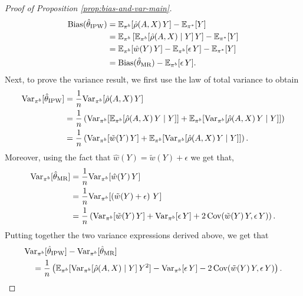 \begin{proof}[Proof of Proposition \ref{prop:bias-and-var-main}]
\begin{align*}
    \textup{Bias}(\hat{\theta}_{\textup{IPW}}) &= \mathbb{E}_{\pi^b}[\hat{\rho}(A, X)\, Y] - \mathbb{E}_{\pi^*}[Y] \\
    &= \mathbb{E}_{\pi^b}\left[\mathbb{E}_{\pi^b}[\hat{\rho}(A, X)\mid Y]\,Y \right] - \mathbb{E}_{\pi^*}[Y]  \\
    &= \mathbb{E}_{\pi^b}[\hat{w}(Y)\, Y] - \mathbb{E}_{\pi^b}[\epsilon\, Y] - \mathbb{E}_{\pi^*}[Y] \\
    &= \textup{Bias}(\hat{\theta}_{\textup{MR}}) - \mathbb{E}_{\pi^b}[\epsilon\, Y].
\end{align*}
Next, to prove the variance result, we first use the law of total variance to obtain
\begin{align*}
    \textup{Var}_{\pi^b}[\hat{\theta}_{\textup{IPW}}] &= \frac{1}{n} \textup{Var}_{\pi^b}[\hat{\rho}(A, X)\,Y]\\
    &= \frac{1}{n} \left( \textup{Var}_{\pi^b}[\mathbb{E}_{\pi^b}[\hat{\rho}(A, X)\,Y\mid Y]] + \mathbb{E}_{\pi^b}[\textup{Var}_{\pi^b}[\hat{\rho}(A, X)\,Y\mid Y]]\right)\\
    &= \frac{1}{n} \left( \textup{Var}_{\pi^b}[\tilde{w}(Y)\,Y] + \mathbb{E}_{\pi^b}[\textup{Var}_{\pi^b}[\hat{\rho}(A, X)\,Y\mid Y]]\right).
\end{align*}
Moreover, using the fact that $\hat{w}(Y) = \tilde{w}(Y) + \epsilon$ we get that,
\begin{align*}
    \textup{Var}_{\pi^b}[\hat{\theta}_{\textup{MR}}] &= \frac{1}{n} \textup{Var}_{\pi^b}[\hat{w}(Y)\,Y]\\
    &= \frac{1}{n} \textup{Var}_{\pi^b}[\left(\tilde{w}(Y) + \epsilon \right)\,Y]\\
    &= \frac{1}{n} \left( \textup{Var}_{\pi^b}[\tilde{w}(Y)\,Y] + \textup{Var}_{\pi^b}[\epsilon\,Y] + 2\,\textup{Cov}(\tilde{w}(Y)\,Y, \epsilon\,Y)\right).
\end{align*}
Putting together the two variance expressions derived above, we get that
\begin{align*}
    &\textup{Var}_{\pi^b}[\hat{\theta}_{\textup{IPW}}] - \textup{Var}_{\pi^b}[\hat{\theta}_{\textup{MR}}]\\
    &\quad=
    \frac{1}{n}\left(\mathbb{E}_{\pi^b}[\textup{Var}_{\pi^b}[\hat{\rho}(A, X)\mid Y]\,Y^2] - \textup{Var}_{\pi^b}[\epsilon\,Y] - 2\,\textup{Cov}(\tilde{w}(Y)\,Y, \epsilon\,Y) \right).
\end{align*}


\end{proof}
